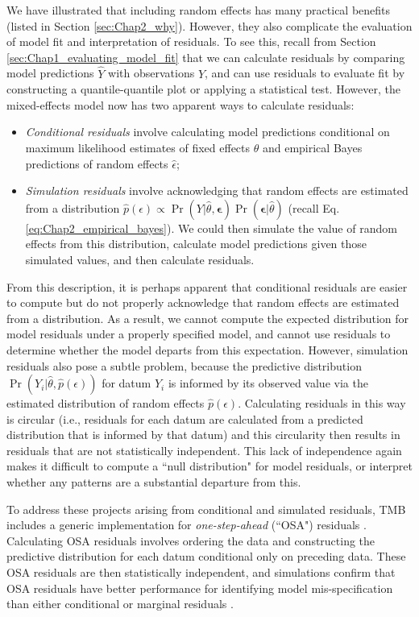 We have illustrated that including random effects has many practical benefits (listed in Section \ref{sec:Chap2_why}).  However, they also complicate the evaluation of model fit and interpretation of residuals. To see this, recall from Section \ref{sec:Chap1_evaluating_model_fit} that we can calculate residuals by comparing model predictions \(\hat Y\) with observations \(Y\), and can use residuals to evaluate fit by constructing a quantile-quantile plot or applying a statistical test.  However, the mixed-effects model now has two apparent ways to calculate residuals:
\begin{itemize}
    \item \textit{Conditional residuals} involve calculating model predictions conditional on maximum likelihood estimates of fixed effects \(\hat \theta\) and empirical Bayes predictions of random effects \(\hat \epsilon\);

    \item \textit{Simulation residuals} involve acknowledging that random effects are estimated from a distribution \(\hat p(\epsilon) \propto \Pr(Y | \hat{\theta}, \mathbf{\epsilon}) \Pr( \mathbf{\epsilon} | \hat{\theta})\) (recall Eq. \ref{eq:Chap2_empirical_bayes}).  We could then simulate the value of random effects from this distribution, calculate model predictions given those simulated values, and then calculate residuals.  
\end{itemize}
From this description, it is perhaps apparent that conditional residuals are easier to compute but do not properly acknowledge that random effects are estimated from a distribution.  As a result, we cannot compute the expected distribution for model residuals under a properly specified model, and cannot use residuals to determine whether the model departs from this expectation.  However, simulation residuals also pose a subtle problem, because the predictive distribution \(\Pr(Y_i|\hat \theta, \hat p(\epsilon))\) for datum \(Y_i\) is informed by its observed value via the estimated distribution of random effects \(\hat p(\epsilon)\). Calculating residuals in this way is circular (i.e., residuals for each datum are calculated from a predicted distribution that is informed by that datum) and this circularity then results in residuals that are not statistically independent.  This lack of independence again makes it difficult to compute a ``null distribution" for model residuals, or interpret whether any patterns are a substantial departure from this.  

To address these projects arising from conditional and simulated residuals, TMB includes a generic implementation for \textit{one-step-ahead} (``OSA") residuals \cite{thygesen_validation_2017}.  Calculating OSA residuals involves ordering the data and constructing the predictive distribution for each datum conditional only on preceding data.  These OSA residuals are then statistically independent, and simulations confirm that OSA residuals have better performance for identifying model mis-specification than either conditional or marginal residuals \cite{trijoulet_performance_2020}.    

